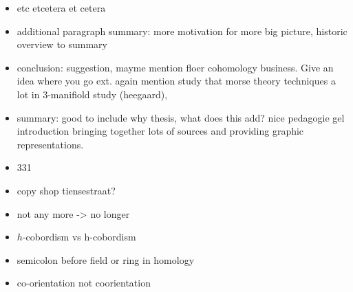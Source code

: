 \begin{itemize}
        \item etc etcetera et cetera
        \item additional paragraph summary: more motivation for more big picture, historic overview  to summary
        \item conclusion: suggestion, mayme mention floer cohomology business. Give an idea where you go ext.  again mention study that morse theory techniques a lot in 3-manifiold study (heegaard), 
        \item summary: good to include  why thesis, what does this add? nice pedagogie gel introduction bringing together lots of sources and providing graphic representations.
        \item 331
        \item copy shop tiensestraat?
        \item not any more -> no longer
        \item $h$-cobordism vs h-cobordism
        \item semicolon before field or ring in homology
        \item co-orientation not coorientation
\end{itemize}
